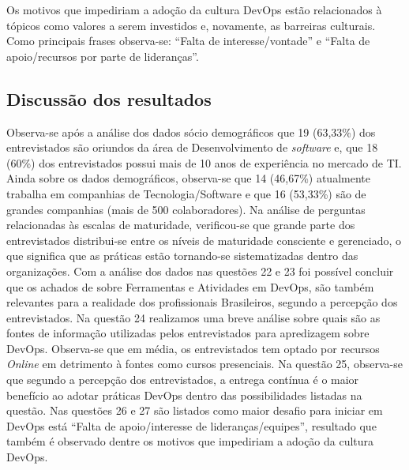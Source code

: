 \documentclass[twoside,english,brazilian]{UNISINOSartigo}
\begin{document}
Os motivos que impediriam a adoção da cultura DevOps estão relacionados à tópicos como valores a serem investidos e, novamente, as barreiras culturais. Como principais frases observa-se: ``Falta de interesse/vontade'' e ``Falta de apoio/recursos por parte de lideranças''.

\subsection{Discussão dos resultados}
Observa-se após a análise dos dados sócio demográficos que 19 (63,33\%) dos entrevistados são oriundos da área de Desenvolvimento de \textit{software} e, que 18 (60\%) dos entrevistados possui mais de 10 anos de experiência no mercado de TI. Ainda sobre os dados demográficos, observa-se que 14 (46,67\%) atualmente trabalha em companhias de Tecnologia/Software e que 16 (53,33\%) são de grandes companhias (mais de 500 colaboradores).
Na análise de perguntas relacionadas às escalas de maturidade, verificou-se que grande parte dos entrevistados distribui-se entre os níveis de maturidade consciente e gerenciado, o que significa que as práticas estão tornando-se sistematizadas dentro das organizações.
Com a análise dos dados nas questões 22 e 23 foi possível concluir que os achados de  sobre Ferramentas e Atividades em DevOps, são também relevantes para a realidade dos profissionais Brasileiros, segundo a percepção dos entrevistados. 
Na questão 24 realizamos uma breve análise sobre quais são as fontes de informação utilizadas pelos entrevistados para apredizagem sobre DevOps. Observa-se que em média, os entrevistados tem optado por recursos \textit{Online} em detrimento à fontes como cursos presenciais.
Na questão 25, observa-se que segundo a percepção dos entrevistados, a entrega contínua é o maior benefício ao adotar práticas DevOps dentro das possibilidades listadas na questão. 
Nas questões 26 e 27 são listados como maior desafio para iniciar em DevOps está ``Falta de apoio/interesse de lideranças/equipes'', resultado que também é observado dentre os motivos que impediriam a adoção da cultura DevOps. 
\end{document}

